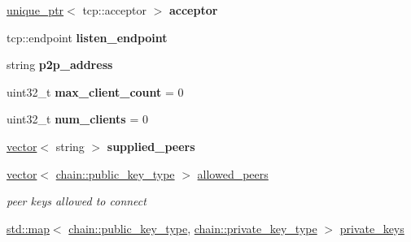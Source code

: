 \begin{DoxyCompactItemize}
\item 
\mbox{\label{classaacio_1_1net__plugin__impl_a0017bc1b2d5f1f40c380194be25866b1}} 
\mbox{\hyperlink{classfc_1_1unique__ptr}{unique\+\_\+ptr}}$<$ tcp\+::acceptor $>$ {\bfseries acceptor}
\item 
\mbox{\label{classaacio_1_1net__plugin__impl_a2b8ae835ef8c1957b5621da18e28c583}} 
tcp\+::endpoint {\bfseries listen\+\_\+endpoint}
\item 
\mbox{\label{classaacio_1_1net__plugin__impl_a2caccce96de3159bd9aeb3394f8a41ff}} 
string {\bfseries p2p\+\_\+address}
\item 
\mbox{\label{classaacio_1_1net__plugin__impl_a740f4f1f3de0fd6ce32d6f049947944a}} 
uint32\+\_\+t {\bfseries max\+\_\+client\+\_\+count} = 0
\item 
\mbox{\label{classaacio_1_1net__plugin__impl_a787819a7c9301aa0f0f495b00e15e633}} 
uint32\+\_\+t {\bfseries num\+\_\+clients} = 0
\item 
\mbox{\label{classaacio_1_1net__plugin__impl_ab36a8a940ba0aac525abab330b6356f2}} 
\mbox{\hyperlink{classstd_1_1vector}{vector}}$<$ string $>$ {\bfseries supplied\+\_\+peers}
\item 
\mbox{\label{classaacio_1_1net__plugin__impl_a2e7c0d1abf1ae7ba0c3ef7d76f8caa88}} 
\mbox{\hyperlink{classstd_1_1vector}{vector}}$<$ \mbox{\hyperlink{classfc_1_1crypto_1_1public__key}{chain\+::public\+\_\+key\+\_\+type}} $>$ \mbox{\hyperlink{classaacio_1_1net__plugin__impl_a2e7c0d1abf1ae7ba0c3ef7d76f8caa88}{allowed\+\_\+peers}}
\begin{DoxyCompactList}\small\item\em peer keys allowed to connect \end{DoxyCompactList}\item 
\mbox{\label{classaacio_1_1net__plugin__impl_a96c7651847e5d15f2dc8f5c3ff7223d6}} 
\mbox{\hyperlink{classstd_1_1map}{std\+::map}}$<$ \mbox{\hyperlink{classfc_1_1crypto_1_1public__key}{chain\+::public\+\_\+key\+\_\+type}}, \mbox{\hyperlink{classfc_1_1crypto_1_1private__key}{chain\+::private\+\_\+key\+\_\+type}} $>$ \mbox{\hyperlink{classaacio_1_1net__plugin__impl_a96c7651847e5d15f2dc8f5c3ff7223d6}{private\+\_\+keys}}

\end{DoxyCompactItemize}

